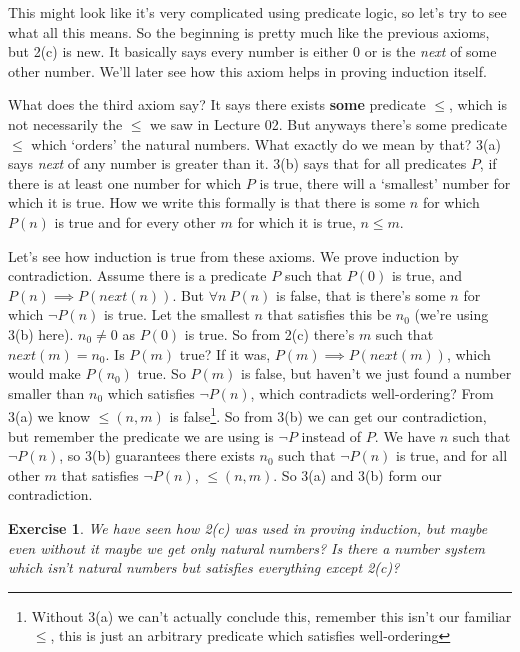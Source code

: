 \documentclass[a4paper,10pt]{article}
\newtheorem{exercise}{Exercise}[section]
\theoremstyle{definition} %
\begin{document}
    This might look like it's very complicated using predicate logic, so let's try to see
    what all this means. So the beginning is pretty much like the previous axioms, but 2(c)
    is new. It basically says every number is either 0 or is the \emph{next} of some other number.
    We'll later see how this axiom helps in proving induction itself.

    What does the third axiom say? It says there exists \textbf{some} predicate $\leq$, which 
    is not necessarily the $\leq$ we saw in Lecture 02. But anyways there's some predicate
    $\leq$ which `orders' the natural numbers. What exactly do we mean by that? 3(a) says
    \emph{next} of any number is greater than it. 3(b) says that for all predicates $P$, if
    there is at least one number for which $P$ is true, there will a `smallest' number for
    which it is true. How we write this formally is that there is some $n$ for which $P(n)$ is
    true and for every other $m$ for which it is true, $n \leq m$.

    Let's see how induction is true from these axioms. We prove induction by contradiction.
    Assume there is a predicate $P$ such that $P(0)$ is true, and $P(n) \implies P(next(n))$.
    But $\forall n \ P(n)$ is false, that is there's some $n$ for which $\lnot P(n)$ is true.
    Let the smallest $n$ that satisfies this be $n_0$ (we're using 3(b) here).
    $n_0 \neq 0$ as $P(0)$ is true. So from 2(c) there's $m$ such that $next(m) = n_0$.
    Is $P(m)$ true? If it was, $P(m) \implies P(next(m))$, which would make $P(n_0)$ true.
    \newpage
    So $P(m)$ is false, but haven't we just found a number smaller than $n_0$ which satisfies
    $\lnot P(n)$, which contradicts well-ordering? From 3(a) we know $\leq(n, m)$ is false\footnote
    {Without 3(a) we can't actually conclude this, remember this isn't our familiar
    $\leq$, this is just an arbitrary predicate which satisfies well-ordering}.
    So from 3(b) we can get our contradiction, but remember the predicate we are using is 
    $\lnot P$ instead of $P$. We have $n$ such that $\lnot P(n)$, so 3(b) guarantees
    there exists $n_0$ such that $\lnot P(n)$ is true, and for all other $m$ that
    satisfies $\lnot P(n)$, $\leq(n,m)$. So 3(a) and 3(b) form our contradiction.

    \begin{exercise}
        We have seen how 2(c) was used in proving induction, but maybe even without it
        maybe we get only natural numbers? Is there a number system which isn't natural numbers
        but satisfies everything except 2(c)?
    \end{exercise}
\end{document}
